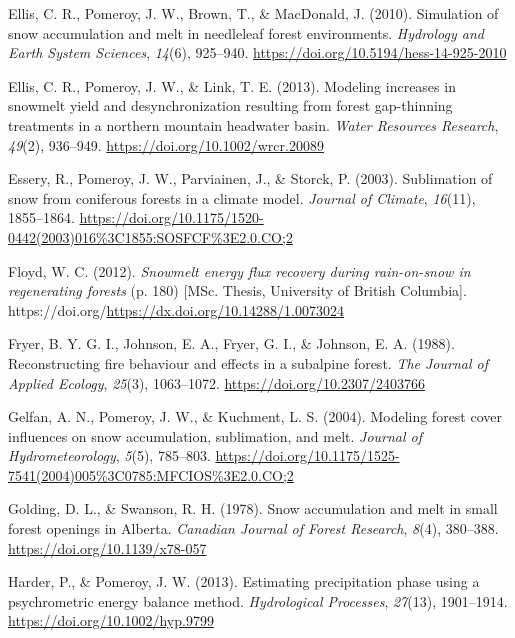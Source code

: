 \documentclass[
  letterpaper,
  DIV=11,
  numbers=noendperiod]{scrartcl}
\newlength{\cslhangindent}
\newenvironment{CSLReferences}[2] %
 {\begin{list}{}{%
  \setlength{\itemindent}{0pt}
  \setlength{\leftmargin}{0pt}
  \setlength{\parsep}{0pt}
  \ifodd #1
   \setlength{\leftmargin}{\cslhangindent}
   \setlength{\itemindent}{-1\cslhangindent}
  \fi
  \setlength{\itemsep}{#2\baselineskip}}}
 {\end{list}}
\begin{document}
\begin{CSLReferences}{1}{0}
Ellis, C. R., Pomeroy, J. W., Brown, T., \& MacDonald, J. (2010).
Simulation of snow accumulation and melt in needleleaf forest
environments. \emph{Hydrology and Earth System Sciences}, \emph{14}(6),
925--940. \url{https://doi.org/10.5194/hess-14-925-2010}

Ellis, C. R., Pomeroy, J. W., \& Link, T. E. (2013). Modeling increases
in snowmelt yield and desynchronization resulting from forest
gap-thinning treatments in a northern mountain headwater basin.
\emph{Water Resources Research}, \emph{49}(2), 936--949.
\url{https://doi.org/10.1002/wrcr.20089}

Essery, R., Pomeroy, J. W., Parviainen, J., \& Storck, P. (2003).
Sublimation of snow from coniferous forests in a climate model.
\emph{Journal of Climate}, \emph{16}(11), 1855--1864.
\url{https://doi.org/10.1175/1520-0442(2003)016\%3C1855:SOSFCF\%3E2.0.CO;2}

Floyd, W. C. (2012). \emph{Snowmelt energy flux recovery during
rain-on-snow in regenerating forests} (p. 180) {[}MSc. Thesis,
University of British Columbia{]}.
https://doi.org/\url{https://dx.doi.org/10.14288/1.0073024}

Fryer, B. Y. G. I., Johnson, E. A., Fryer, G. I., \& Johnson, E. A.
(1988). Reconstructing fire behaviour and effects in a subalpine forest.
\emph{The Journal of Applied Ecology}, \emph{25}(3), 1063--1072.
\url{https://doi.org/10.2307/2403766}

Gelfan, A. N., Pomeroy, J. W., \& Kuchment, L. S. (2004). Modeling
forest cover influences on snow accumulation, sublimation, and melt.
\emph{Journal of Hydrometeorology}, \emph{5}(5), 785--803.
\url{https://doi.org/10.1175/1525-7541(2004)005\%3C0785:MFCIOS\%3E2.0.CO;2}

Golding, D. L., \& Swanson, R. H. (1978). Snow accumulation and melt in
small forest openings in {Alberta}. \emph{Canadian Journal of Forest
Research}, \emph{8}(4), 380--388. \url{https://doi.org/10.1139/x78-057}

Harder, P., \& Pomeroy, J. W. (2013). Estimating precipitation phase
using a psychrometric energy balance method. \emph{Hydrological
Processes}, \emph{27}(13), 1901--1914.
\url{https://doi.org/10.1002/hyp.9799}


\end{CSLReferences}
\end{document}
